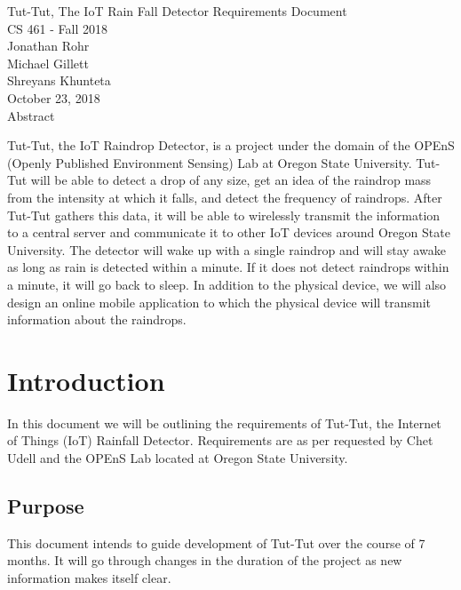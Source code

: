 \documentclass[letterpaper,10pt,draftclsnofoot,onecolumn]{article}
\begin{document}
\begin{titlepage}
\vspace*{\fill}
\begin{center}
{\Large Tut-Tut, The IoT Rain Fall Detector Requirements Document}
\\[0.3cm]

{\large CS 461 - Fall 2018}
\\[0.3cm]

{\large Jonathan Rohr}
\\[0.3cm]

{\large Michael Gillett}
\\[0.3cm]

{\large Shreyans Khunteta}
\\[0.3cm]

{\large October 23, 2018}
\\[1cm]

{\Large Abstract}
\end{center}
Tut-Tut, the IoT Raindrop Detector, is a project under the domain of the OPEnS (Openly Published Environment Sensing) Lab at Oregon State University. Tut-Tut will be able to detect a drop of any size, get an idea of the raindrop mass from the intensity at which it falls, and detect the frequency of raindrops. After Tut-Tut gathers this data, it will be able to wirelessly transmit the information to a central server and communicate it to other IoT devices around Oregon State University. The detector will wake up with a single raindrop and will stay awake as long as rain is detected within a minute. If it does not detect raindrops within a minute, it will go back to sleep. In addition to the physical device, we will also design an online mobile application to which the physical device will transmit information about the raindrops.
\vspace*{\fill}
\end{titlepage}

\section{Introduction}
In this document we will be outlining the requirements of Tut-Tut, the Internet of Things (IoT) Rainfall Detector. Requirements are as per requested by Chet Udell and the OPEnS Lab located at Oregon State University.

\subsection{Purpose}
This document intends to guide development of Tut-Tut over the course of 7 months. It will go through changes in the duration of the project as new information makes itself clear.
\end{document}

